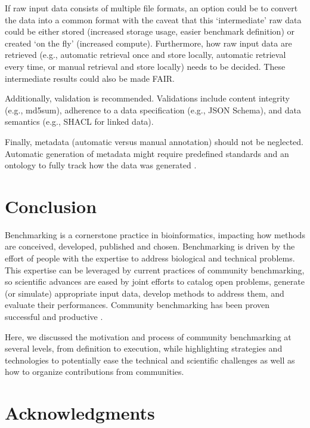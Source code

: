 \documentclass[11pt]{article}
\begin{document}
If raw input data consists of multiple file formats, an option could be to convert the data into a common format with the caveat that this `intermediate' raw data could be either stored (increased storage usage, easier benchmark definition) or created `on the fly' (increased compute). Furthermore, how raw input data are retrieved (e.g., automatic retrieval once and store locally, automatic retrieval every time, or manual retrieval and store locally) needs to be decided. These intermediate results could also be made FAIR.

Additionally, validation is recommended. Validations include content integrity (e.g., md5sum), adherence to a data specification (e.g., JSON Schema), and data semantics (e.g., SHACL for linked data). 

Finally, metadata (automatic versus manual annotation) should not be neglected. Automatic generation of metadata might require predefined standards and an ontology to fully track how the data was generated \cite{LeboUnknown-om}. 

\section*{Conclusion}
\label{sec:conclusion}

Benchmarking is a cornerstone practice in bioinformatics, impacting how methods are conceived, developed, published and chosen. Benchmarking is driven by the effort of people with the expertise to address biological and technical problems. This expertise can be leveraged by current practices of community benchmarking, so scientific advances are eased by joint efforts to catalog open problems, generate (or simulate) appropriate input data, develop methods to address them, and evaluate their performances. Community benchmarking has been proven successful and  productive \cite{moult2005-ne,Capella-Gutierrez2017-dh,Luecken2024-fk}.

Here, we discussed the motivation and process of community benchmarking at several levels, from definition to execution, while highlighting strategies and technologies to potentially ease the technical and scientific challenges as well as how to organize contributions from communities. 


\section*{Acknowledgments} 
\end{document}
